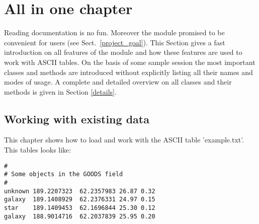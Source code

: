 \section{All in one chapter}
\label{allinonechapter}
Reading documentation is no fun. Moreover the \AAD module promised to be
convenient for users (see Sect.\ \ref{project_goal}). This Section gives
a fast introduction on all features of the \AAD module and how these features
are used to work with ASCII tables. On the basis of some sample session
the most important classes and methods are introduced without
explicitly listing all their names and modes of usage. A complete and
detailed overview on all \AAD classes and their methods is given in
Section \ref{details}.

\subsection{Working with existing data}
\label{existingdata}
This chapter shows how to load and work with the ASCII table 'example.txt'.
This tables looks like:
\begin{verbatim}
#
# Some objects in the GOODS field
#
unknown 189.2207323  62.2357983 26.87 0.32
galaxy  189.1408929  62.2376331 24.97 0.15
star    189.1409453  62.1696844 25.30 0.12
galaxy  188.9014716  62.2037839 25.95 0.20
\end{verbatim}

